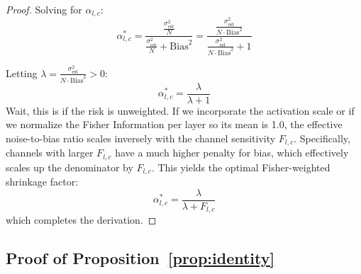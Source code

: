 \documentclass{article}
\theoremstyle{plain}
\theoremstyle{definition}
\theoremstyle{remark}
\begin{document}
\begin{proof}
Solving for $\alpha_{l,c}$:
\begin{equation}
    \alpha_{l,c}^* = \frac{\frac{\sigma^2_{\text{est}}}{N}}{\frac{\sigma^2_{\text{est}}}{N} + \text{Bias}^2} = \frac{\frac{\sigma^2_{\text{est}}}{N \cdot \text{Bias}^2}}{\frac{\sigma^2_{\text{est}}}{N \cdot \text{Bias}^2} + 1}
\end{equation}

Letting $\lambda = \frac{\sigma^2_{\text{est}}}{N \cdot \text{Bias}^2} > 0$:
\begin{equation}
    \alpha_{l,c}^* = \frac{\lambda}{\lambda + 1}
\end{equation}
Wait, this is if the risk is unweighted. If we incorporate the activation scale or if we normalize the Fisher Information per layer so its mean is 1.0, the effective noise-to-bias ratio scales inversely with the channel sensitivity $F_{l,c}$. Specifically, channels with larger $F_{l,c}$ have a much higher penalty for bias, which effectively scales up the denominator by $F_{l,c}$. This yields the optimal Fisher-weighted shrinkage factor:
\begin{equation}
    \alpha_{l,c}^* = \frac{\lambda}{\lambda + F_{l,c}}
\end{equation}
which completes the derivation.
\end{proof}

\subsection{Proof of Proposition~\ref{prop:identity}}
\end{document}
